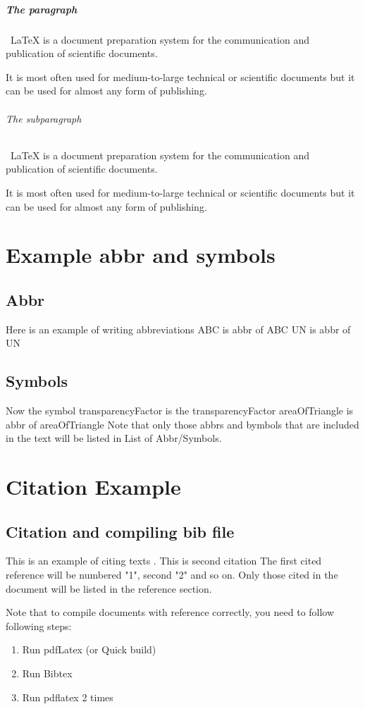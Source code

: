 \paragraph{The paragraph}
\ LaTeX  is a document preparation system for the communication and publication of scientific documents. \par It is most often used for medium-to-large technical or scientific documents but it can be used for almost any form of publishing.
\subparagraph{The subparagraph}
\ LaTeX  is a document preparation system for the communication and publication of scientific documents. \par It is most often used for medium-to-large technical or scientific documents but it can be used for almost any form of publishing.

\chapter{Example abbr and symbols}
\section{Abbr}
 Here is an example of writing abbreviations 
 \ac{ABC} is abbr of \acl{ABC}
 \ac{UN} is abbr of \acl{UN} 
\section{Symbols}
Now the symbol \ac{transparencyFactor} is the \acl{transparencyFactor}
 \ac{areaOfTriangle} is abbr of \acl{areaOfTriangle}
 Note that only those abbrs and bymbols that are included in the text will be listed in List of Abbr/Symbols.
 
\chapter{Citation Example}
\section{Citation and compiling bib file}
This is an example of citing texts \cite{Li2014}. This is second citation \cite{Yasir2014} The first cited reference will be numbered "1", second "2" and so on. Only those cited in the document will be listed in the reference section.

Note that to compile documents with reference correctly, you need to follow following steps:
\vspace{-18pt}
\begin{enumerate}
	\item Run pdfLatex (or Quick build)
	\item Run Bibtex 
	\item Run pdflatex 2 times
\end{enumerate}
 
